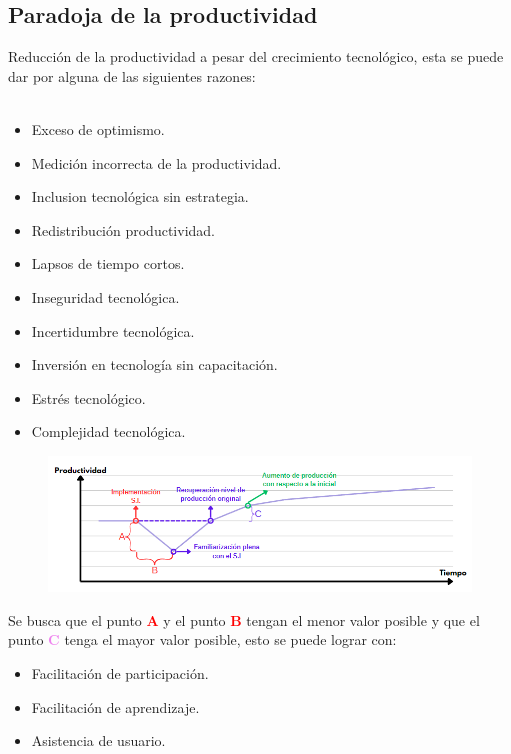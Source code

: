 \documentclass{templateNote}
\begin{document}
\subsection{Paradoja de la productividad}
\noindent Reducción de la productividad a pesar del crecimiento tecnológico, esta se puede dar por alguna de las siguientes razones: \\\\
\begin{minipage}{0.45\textwidth}
    \begin{itemize}
        \item Exceso de optimismo.
        \item Medición incorrecta de la productividad.
        \item Inclusion tecnológica sin estrategia.
        \item Redistribución productividad.
        \item Lapsos de tiempo cortos. 
    \end{itemize}
\end{minipage}
\hspace{0.1\textwidth}
\begin{minipage}{0.45\textwidth}
    \begin{itemize}
        \item Inseguridad tecnológica.
        \item Incertidumbre tecnológica.
        \item Inversión en tecnología sin capacitación.
        \item Estrés tecnológico.
        \item Complejidad tecnológica.
    \end{itemize}
\end{minipage}
\begin{center}
    \begin{figure}[H]   
        \centering
        \includegraphics[width=1\textwidth]{img/paradoja.png}
        \vspace{-1.5cm}
    \end{figure}
\end{center}
Se busca que el punto \textcolor{red}{\textbf{A}} y el punto \textcolor{red}{\textbf{B}} tengan el menor valor posible y que el punto \textcolor{violet}{\textbf{C}} tenga el mayor valor posible, esto se puede lograr con:\begin{itemize}
    \item Facilitación de participación.
    \item Facilitación de aprendizaje.
    \item Asistencia de usuario.
\end{itemize}
\end{document}
